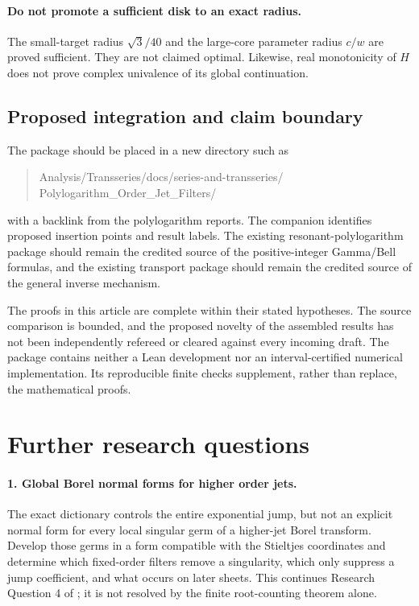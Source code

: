 \documentclass[11pt,a4paper]{article}
\numberwithin{equation}{section}
\theoremstyle{definition}\newtheorem{definition}[theorem]{Definition}
\theoremstyle{remark}\newtheorem{remark}[theorem]{Remark}
\begin{document}
\paragraph{Do not promote a sufficient disk to an exact radius.}
The small-target radius $\sqrt3/40$ and the large-core parameter radius
$c/w$ are proved sufficient. They are not claimed optimal. Likewise,
real monotonicity of $H$ does not prove complex univalence of its global
continuation.

\subsection{Proposed integration and claim boundary}
The package should be placed in a new directory such as
\begin{quote}\small\ttfamily
Analysis/Transseries/docs/series-and-transseries/\\
Polylogarithm\_Order\_Jet\_Filters/
\end{quote}
with a backlink from the polylogarithm reports. The companion
 identifies proposed insertion points
and result labels. The existing resonant-polylogarithm package should
remain the credited source of the positive-integer Gamma/Bell formulas,
and the existing transport package should remain the credited source
of the general inverse mechanism.

The proofs in this article are complete within their stated hypotheses.
The source comparison is bounded, and the proposed novelty of the
assembled results has not been independently refereed or cleared against
every incoming draft. The package contains neither a Lean development nor
an interval-certified numerical implementation. Its reproducible finite
checks supplement, rather than replace, the mathematical proofs.

\section{Further research questions}
\label{ojf:sec:future}

\paragraph{1. Global Borel normal forms for higher order jets.}
The exact dictionary controls the entire exponential jump, but not an
explicit normal form for every local singular germ of a higher-jet Borel
transform. Develop those germs in a form compatible with the Stieltjes
coordinates and determine which fixed-order filters remove a singularity,
which only suppress a jump coefficient, and what occurs on later sheets.
This continues Research Question 4 of \cite{RepoResonant}; it is not
resolved by the finite root-counting theorem alone.
\end{document}
